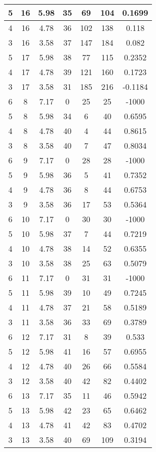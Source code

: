 \documentclass[letterpaper, 12pt]{article}
\begin{document}
\begin{longtable}{|c|c|c|c|c|c|c|}
\hline
5 & 16 & 5.98 & 35 & 69 & 104 & 0.1699 \\
\hline
4 & 16 & 4.78 & 36 & 102 & 138 & 0.118 \\
\hline
3 & 16 & 3.58 & 37 & 147 & 184 & 0.082 \\
\hline
5 & 17 & 5.98 & 38 & 77 & 115 & 0.2352 \\
\hline
4 & 17 & 4.78 & 39 & 121 & 160 & 0.1723 \\
\hline
3 & 17 & 3.58 & 31 & 185 & 216 & -0.1184 \\
\hline
6 & 8 & 7.17 & 0 & 25 & 25 & -1000 \\
\hline
5 & 8 & 5.98 & 34 & 6 & 40 & 0.6595 \\
\hline
4 & 8 & 4.78 & 40 & 4 & 44 & 0.8615 \\
\hline
3 & 8 & 3.58 & 40 & 7 & 47 & 0.8034 \\
\hline
6 & 9 & 7.17 & 0 & 28 & 28 & -1000 \\
\hline
5 & 9 & 5.98 & 36 & 5 & 41 & 0.7352 \\
\hline
4 & 9 & 4.78 & 36 & 8 & 44 & 0.6753 \\
\hline
3 & 9 & 3.58 & 36 & 17 & 53 & 0.5364 \\
\hline
6 & 10 & 7.17 & 0 & 30 & 30 & -1000 \\
\hline
5 & 10 & 5.98 & 37 & 7 & 44 & 0.7219 \\
\hline
4 & 10 & 4.78 & 38 & 14 & 52 & 0.6355 \\
\hline
3 & 10 & 3.58 & 38 & 25 & 63 & 0.5079 \\
\hline
6 & 11 & 7.17 & 0 & 31 & 31 & -1000 \\
\hline
5 & 11 & 5.98 & 39 & 10 & 49 & 0.7245 \\
\hline
4 & 11 & 4.78 & 37 & 21 & 58 & 0.5189 \\
\hline
3 & 11 & 3.58 & 36 & 33 & 69 & 0.3789 \\
\hline
6 & 12 & 7.17 & 31 & 8 & 39 & 0.533 \\
\hline
5 & 12 & 5.98 & 41 & 16 & 57 & 0.6955 \\
\hline
4 & 12 & 4.78 & 40 & 26 & 66 & 0.5584 \\
\hline
3 & 12 & 3.58 & 40 & 42 & 82 & 0.4402 \\
\hline
6 & 13 & 7.17 & 35 & 11 & 46 & 0.5942 \\
\hline
5 & 13 & 5.98 & 42 & 23 & 65 & 0.6462 \\
\hline
4 & 13 & 4.78 & 41 & 42 & 83 & 0.4702 \\
\hline
3 & 13 & 3.58 & 40 & 69 & 109 & 0.3194 \\

\end{longtable}
\end{document}
